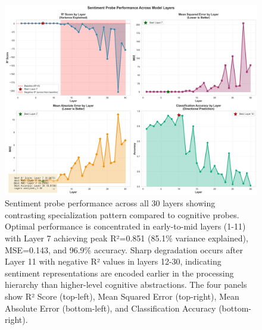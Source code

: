 \documentclass[letterpaper]{article}
\begin{document}
\begin{figure}[!htbp]
\centering
\includegraphics[width=\textwidth]{../data/sentiment_probe_performance.png}
\caption{Sentiment probe performance across all 30 layers showing contrasting specialization pattern compared to cognitive probes. Optimal performance is concentrated in early-to-mid layers (1-11) with Layer 7 achieving peak R²=0.851 (85.1\% variance explained), MSE=0.143, and 96.9\% accuracy. Sharp degradation occurs after Layer 11 with negative R² values in layers 12-30, indicating sentiment representations are encoded earlier in the processing hierarchy than higher-level cognitive abstractions. The four panels show R² Score (top-left), Mean Squared Error (top-right), Mean Absolute Error (bottom-left), and Classification Accuracy (bottom-right).}
\label{fig:sentiment_performance}
\end{figure}
\end{document}
